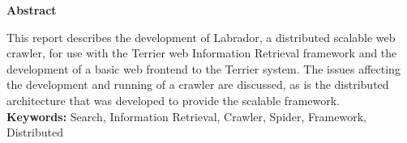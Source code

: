 \begin{center}{\bf\Large Abstract}\end{center}
This report describes the development of Labrador, a distributed scalable web crawler, for use with the Terrier web Information Retrieval framework and the development of a basic web frontend to the Terrier system. The issues affecting the development and running of a crawler are discussed, as is the distributed architecture that was developed to provide the scalable framework.\\

{\bf Keywords:} Search, Information Retrieval, Crawler, Spider, Framework, Distributed
